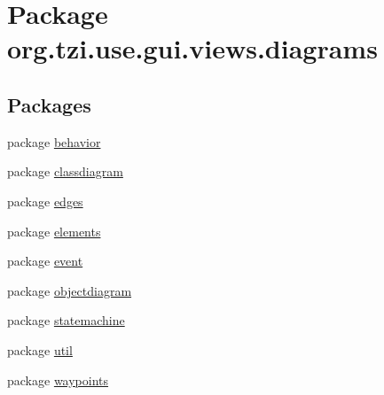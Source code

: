 \hypertarget{namespaceorg_1_1tzi_1_1use_1_1gui_1_1views_1_1diagrams}{\section{Package org.\-tzi.\-use.\-gui.\-views.\-diagrams}
\label{namespaceorg_1_1tzi_1_1use_1_1gui_1_1views_1_1diagrams}
}
\subsection*{Packages}
\begin{DoxyCompactItemize}
\item 
package \hyperlink{namespaceorg_1_1tzi_1_1use_1_1gui_1_1views_1_1diagrams_1_1behavior}{behavior}
\item 
package \hyperlink{namespaceorg_1_1tzi_1_1use_1_1gui_1_1views_1_1diagrams_1_1classdiagram}{classdiagram}
\item 
package \hyperlink{namespaceorg_1_1tzi_1_1use_1_1gui_1_1views_1_1diagrams_1_1edges}{edges}
\item 
package \hyperlink{namespaceorg_1_1tzi_1_1use_1_1gui_1_1views_1_1diagrams_1_1elements}{elements}
\item 
package \hyperlink{namespaceorg_1_1tzi_1_1use_1_1gui_1_1views_1_1diagrams_1_1event}{event}
\item 
package \hyperlink{namespaceorg_1_1tzi_1_1use_1_1gui_1_1views_1_1diagrams_1_1objectdiagram}{objectdiagram}
\item 
package \hyperlink{namespaceorg_1_1tzi_1_1use_1_1gui_1_1views_1_1diagrams_1_1statemachine}{statemachine}
\item 
package \hyperlink{namespaceorg_1_1tzi_1_1use_1_1gui_1_1views_1_1diagrams_1_1util}{util}
\item 
package \hyperlink{namespaceorg_1_1tzi_1_1use_1_1gui_1_1views_1_1diagrams_1_1waypoints}{waypoints}
\end{DoxyCompactItemize}
